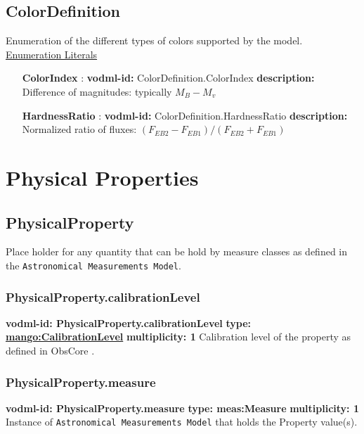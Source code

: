  \subsection{ColorDefinition}
    \label{sect:ColorDefinition}
    Enumeration of the different types of colors supported by the model.
    \noindent \underline{Enumeration Literals}
    \vspace{-\parsep}
    \small
    \begin{itemize}
    \item[\textbf{ColorIndex}]: \textbf{vodml-id:} ColorDefinition.ColorIndex \newline
    \textbf{description:} Difference of magnitudes: typically $M_B - M_v$
    \item[\textbf{HardnessRatio}]: \textbf{vodml-id:} ColorDefinition.HardnessRatio \newline
    \textbf{description:} Normalized ratio of fluxes: $(F_{EB2} - F_{EB1}) / (F_{EB2} + F_{EB1})$
    \end{itemize}
    \normalsize

\section{Physical Properties}

  \subsection{PhysicalProperty}
    \label{sect:PhysicalProperty}
    Place holder for any quantity that can be hold by measure classes as defined in the \texttt{Astronomical Measurements Model}.

    \subsubsection{PhysicalProperty.calibrationLevel}
    \textbf{vodml-id: PhysicalProperty.calibrationLevel} \newline
    \textbf{type: \hyperref[sect:CalibrationLevel]{mango:CalibrationLevel}} \newline
    \textbf{multiplicity: 1} \newline
    Calibration level of the property as defined in ObsCore \citep{2011ivoa.spec.1028T}.

    \subsubsection{PhysicalProperty.measure}
    \textbf{vodml-id: PhysicalProperty.measure} \newline
    \textbf{type: meas:Measure} \newline
    \textbf{multiplicity: 1} \newline
    Instance of \texttt{Astronomical Measurements Model} that holds the Property value(s).

